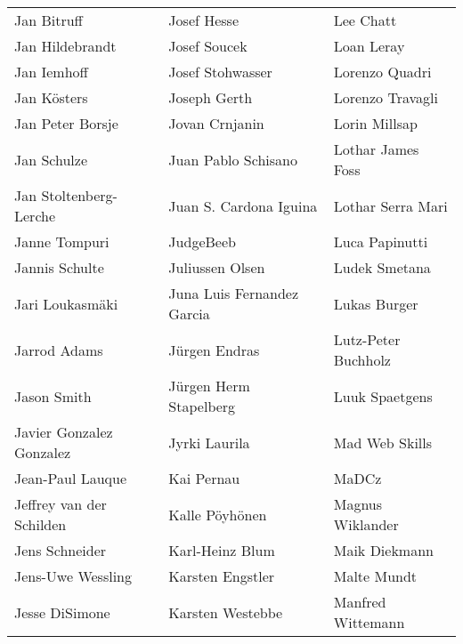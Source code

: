 \begin{tabular}{p{4.5cm}p{4.5cm}p{4.5cm}}
Jan Bitruff & Josef Hesse & Lee Chatt \\
Jan Hildebrandt & Josef Soucek & Loan Leray \\
Jan Iemhoff & Josef Stohwasser & Lorenzo Quadri \\
Jan Kösters & Joseph Gerth & Lorenzo Travagli \\
Jan Peter Borsje & Jovan Crnjanin & Lorin Millsap \\
Jan Schulze & Juan Pablo Schisano & Lothar James Foss \\
Jan Stoltenberg-Lerche & Juan S. Cardona Iguina & Lothar Serra Mari \\
Janne Tompuri & JudgeBeeb & Luca Papinutti \\
Jannis Schulte & Juliussen Olsen & Ludek Smetana \\
Jari Loukasmäki & Juna Luis Fernandez Garcia & Lukas Burger \\
Jarrod Adams & Jürgen Endras & Lutz-Peter Buchholz \\
Jason Smith & Jürgen Herm Stapelberg & Luuk Spaetgens \\
Javier Gonzalez Gonzalez & Jyrki Laurila & Mad Web Skills \\
Jean-Paul Lauque & Kai Pernau & MaDCz \\
Jeffrey van der Schilden & Kalle Pöyhönen & Magnus Wiklander \\
Jens Schneider & Karl-Heinz Blum & Maik Diekmann \\
Jens-Uwe Wessling & Karsten Engstler & Malte Mundt \\
Jesse DiSimone & Karsten Westebbe & Manfred Wittemann \\
\end{tabular}
\newpage
\setlength{\tabcolsep}{1mm}
